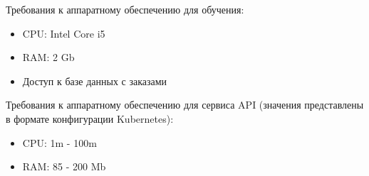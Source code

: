 Требования к аппаратному обеспечению для обучения:
\begin{itemize}
  \item CPU: Intel Core i5
  \item RAM: 2 Gb
  \item Доступ к базе данных с заказами
\end{itemize}

Требования к аппаратному обеспечению для сервиса API (значения представлены в
формате конфигурации Kubernetes):
\begin{itemize}
  \item CPU: 1m - 100m
  \item RAM: 85 - 200 Mb
\end{itemize}
